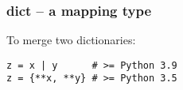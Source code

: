 \subsubsection{dict -- a mapping type}

To merge two dictionaries:
\begin{verbatim}
z = x | y      # >= Python 3.9
z = {**x, **y} # >= Python 3.5
\end{verbatim}

%
